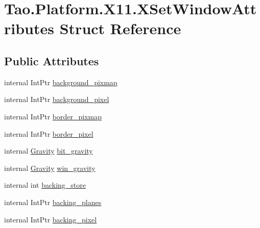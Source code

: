 \hypertarget{struct_tao_1_1_platform_1_1_x11_1_1_x_set_window_attributes}{
\section{Tao.Platform.X11.XSetWindowAttributes Struct Reference}
\label{struct_tao_1_1_platform_1_1_x11_1_1_x_set_window_attributes}
}
\subsection*{Public Attributes}
\begin{DoxyCompactItemize}
\item 
internal IntPtr \hyperlink{struct_tao_1_1_platform_1_1_x11_1_1_x_set_window_attributes_a119fde0b52f285a22fafa74335107737}{background\_\-pixmap}
\item 
internal IntPtr \hyperlink{struct_tao_1_1_platform_1_1_x11_1_1_x_set_window_attributes_ab4328300b055c228cf943e9b7a41c45a}{background\_\-pixel}
\item 
internal IntPtr \hyperlink{struct_tao_1_1_platform_1_1_x11_1_1_x_set_window_attributes_a7cd730ecfd85de45fa9ce8b7e3c6728e}{border\_\-pixmap}
\item 
internal IntPtr \hyperlink{struct_tao_1_1_platform_1_1_x11_1_1_x_set_window_attributes_adb7df58c0572ee3b18ea7892ee76a32d}{border\_\-pixel}
\item 
internal \hyperlink{namespace_tao_1_1_platform_1_1_x11_aede32ff97d046c4afb1ed9f48963b927}{Gravity} \hyperlink{struct_tao_1_1_platform_1_1_x11_1_1_x_set_window_attributes_af67e6d95c672014eb2b4d594ff29c751}{bit\_\-gravity}
\item 
internal \hyperlink{namespace_tao_1_1_platform_1_1_x11_aede32ff97d046c4afb1ed9f48963b927}{Gravity} \hyperlink{struct_tao_1_1_platform_1_1_x11_1_1_x_set_window_attributes_a5d0b214a0ec149586021e711c57ab906}{win\_\-gravity}
\item 
internal int \hyperlink{struct_tao_1_1_platform_1_1_x11_1_1_x_set_window_attributes_a4849b87b00fe8148db722e511730f451}{backing\_\-store}
\item 
internal IntPtr \hyperlink{struct_tao_1_1_platform_1_1_x11_1_1_x_set_window_attributes_a59102c795fc00d3587c486af1350c681}{backing\_\-planes}
\item 
internal IntPtr \hyperlink{struct_tao_1_1_platform_1_1_x11_1_1_x_set_window_attributes_a466afa334b67d3497edc2e47aa64ef6f}{backing\_\-pixel}
\item 

\end{DoxyCompactItemize}
